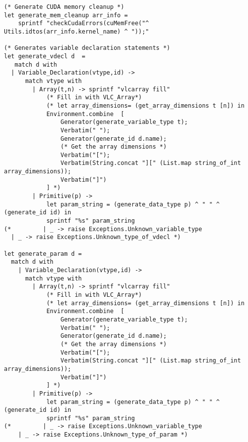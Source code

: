 \begin{verbatim}
(* Generate CUDA memory cleanup *)
let generate_mem_cleanup arr_info = 
    sprintf "checkCudaErrors(cuMemFree("^ Utils.idtos(arr_info.kernel_name) ^ "));"

(* Generates variable declaration statements *)
let generate_vdecl d  = 
   match d with 
  | Variable_Declaration(vtype,id) ->
      match vtype with
        | Array(t,n) -> sprintf "vlcarray fill"
            (* Fill in with VLC_Array*)
            (* let array_dimensions= (get_array_dimensions t [n]) in
            Environment.combine  [
                Generator(generate_variable_type t);
                Verbatim(" ");
                Generator(generate_id d.name);
                (* Get the array dimensions *)
                Verbatim("[");
                Verbatim(String.concat "][" (List.map string_of_int array_dimensions));
                Verbatim("]")
            ] *)
        | Primitive(p) ->
            let param_string = (generate_data_type p) ^ " " ^ (generate_id id) in 
            sprintf "%s" param_string
(*         | _ -> raise Exceptions.Unknown_variable_type
  | _ -> raise Exceptions.Unknown_type_of_vdecl *)

let generate_param d =
  match d with 
    | Variable_Declaration(vtype,id) ->
      match vtype with
        | Array(t,n) -> sprintf "vlcarray fill"
            (* Fill in with VLC_Array*)
            (* let array_dimensions= (get_array_dimensions t [n]) in
            Environment.combine  [
                Generator(generate_variable_type t);
                Verbatim(" ");
                Generator(generate_id d.name);
                (* Get the array dimensions *)
                Verbatim("[");
                Verbatim(String.concat "][" (List.map string_of_int array_dimensions));
                Verbatim("]")
            ] *)
        | Primitive(p) ->
            let param_string = (generate_data_type p) ^ " " ^ (generate_id id) in 
            sprintf "%s" param_string
(*         | _ -> raise Exceptions.Unknown_variable_type
    | _ -> raise Exceptions.Unknown_type_of_param *)


\end{verbatim}
